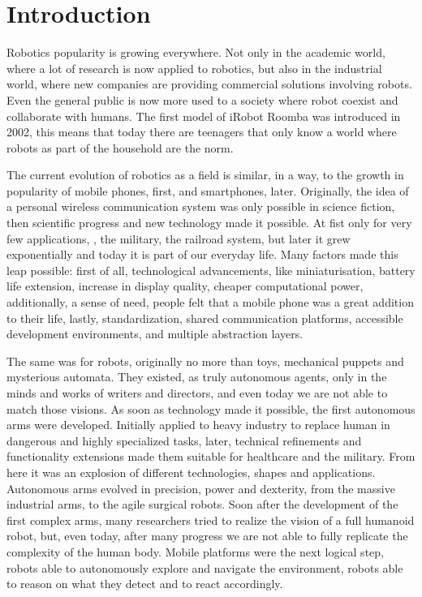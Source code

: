 \chapter{Introduction}\label{ch:introduction}
Robotics popularity is growing everywhere. Not only in the academic world, where a lot of research is now applied to robotics, but also in the industrial world, where new companies are providing commercial solutions involving robots. Even the general public is now more used to a society where robot coexist and collaborate with humans. The first model of iRobot Roomba was introduced in 2002, this means that today there are teenagers that only know a world where robots as part of the household are the norm.

The current evolution of robotics as a field is similar, in a way, to the growth in popularity of mobile phones, first, and smartphones, later.  Originally, the idea of a personal wireless communication system was only possible in science fiction, then scientific progress and new technology made it possible. At fist only for very few applications, \ie, the military, the railroad system, but later it grew exponentially and today it is part of our everyday life. Many factors made this leap possible: first of all, technological advancements, like miniaturisation, battery life extension, increase in display quality, cheaper computational power, additionally, a sense of need, people felt that a mobile phone was a great addition to their life, lastly, standardization, shared communication platforms, accessible development environments, and multiple abstraction layers.

The same was for robots, originally no more than toys, mechanical puppets and mysterious automata. They existed, as truly autonomous agents, only in the minds and works of writers and directors, and even today we are not able to match those visions. As soon as technology made it possible, the first autonomous arms were developed. Initially applied to heavy industry to replace human in dangerous and highly specialized tasks, later, technical refinements and functionality extensions made them suitable for healthcare and the military. From here it was an explosion of different technologies, shapes and applications. Autonomous arms evolved in precision, power and dexterity,  from the massive industrial arms, to the agile surgical robots.  Soon after the development of the first complex arms, many researchers tried to realize the vision of a full humanoid robot, but, even today, after many progress we are not able to fully replicate the complexity of the human body. Mobile platforms were the next logical step, robots able to autonomously explore and navigate the environment, robots able to reason on what they detect and to react accordingly.

